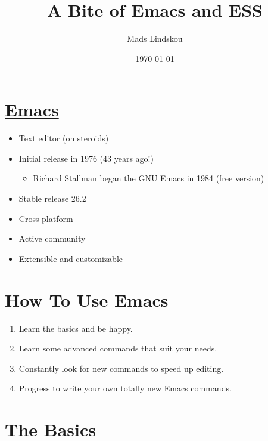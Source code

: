 \documentclass[11pt]{article}
\author{Mads Lindskou}
\date{\today}
\title{A Bite of Emacs and ESS}
\begin{document}
\maketitle
\tableofcontents


\section{\href{img/emacs.png}{Emacs}}
\label{sec:orgc4951c6}

\begin{itemize}
\item Text editor (on steroids)

\item Initial release in 1976 (43 years ago!)

\begin{itemize}
\item Richard Stallman began the GNU Emacs in 1984 (free version)
\end{itemize}

\item Stable release 26.2

\item Cross-platform

\item Active community

\item Extensible and customizable
\end{itemize}

\section{How To Use Emacs}
\label{sec:orgb26cfbd}

\begin{enumerate}
\item Learn the basics and be happy.

\item Learn some advanced commands that suit your needs.

\item Constantly look for new commands to speed up editing.

\item Progress to write your own totally new Emacs commands.
\end{enumerate}

\section{The Basics}
\label{sec:org43efa09}
\end{document}
